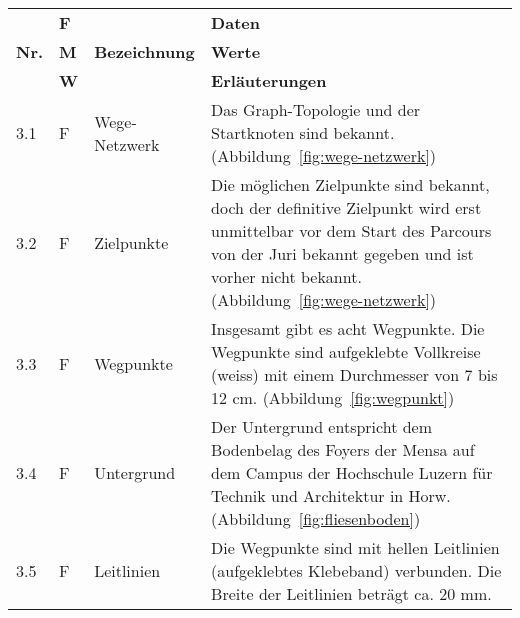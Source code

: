 \documentclass[main.tex]{subfiles} %
\begin{document}
\begin{tabular}{|l|p{0.5cm}|p{4cm}|p{10cm}|}
  \hline
               & \textbf{F} &                               & \textbf{Daten}                                                                                                                                                                                                       \\
  \textbf{Nr.} & \textbf{M} & \textbf{Bezeichnung}          & \textbf{Werte}                                                                                                                                                                                                       \\
               & \textbf{W} &                               & \textbf{Erläuterungen}                                                                                                                                                                                               \\
  \hline
  3.1          & F          & Wege-Netzwerk                 & Das Graph-Topologie und der Startknoten sind bekannt. (Abbildung~\ref{fig:wege-netzwerk})                                                                                                                            \\
  \hline
  3.2          & F          & Zielpunkte                    & Die möglichen Zielpunkte sind bekannt, doch der definitive Zielpunkt wird erst unmittelbar vor dem Start des Parcours von der Juri bekannt gegeben und ist vorher nicht bekannt. (Abbildung~\ref{fig:wege-netzwerk}) \\
  \hline
  3.3          & F          & Wegpunkte                     & Insgesamt gibt es acht Wegpunkte. Die Wegpunkte sind aufgeklebte Vollkreise (weiss) mit einem Durchmesser von 7 bis 12 cm. (Abbildung~\ref{fig:wegpunkt})                                                            \\
  \hline
  3.4          & F          & Untergrund                    & Der Untergrund entspricht dem Bodenbelag des Foyers der Mensa auf dem Campus der Hochschule Luzern für Technik und Architektur in Horw. (Abbildung~\ref{fig:fliesenboden})                                           \\
  \hline
  3.5          & F          & Leitlinien                    & Die Wegpunkte sind mit hellen Leitlinien (aufgeklebtes Klebeband) verbunden. Die Breite der Leitlinien beträgt ca. 20 mm.                                                                                            \\

\end{tabular}
\end{document}
